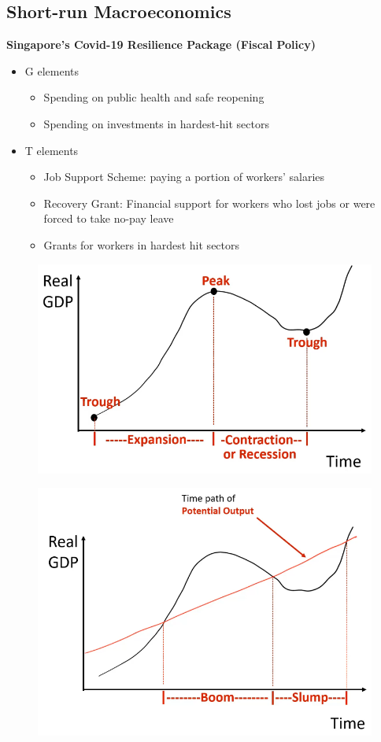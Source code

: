 \documentclass{article}
\begin{document}
\begin{multicols}{2}
\section{Short-run Macroeconomics}
\textbf{Singapore's Covid-19 Resilience Package (Fiscal Policy)}
\begin{itemize}
	\item G elements
	\begin{itemize}
		\item Spending on public health and safe reopening
		\item Spending on investments in hardest-hit sectors
	\end{itemize}
    \item T elements
    \begin{itemize}
    	\item Job Support Scheme: paying a portion of workers' salaries
    	\item Recovery Grant: Financial support for workers who lost jobs or were forced to take no-pay leave
    	\item Grants for workers in hardest hit sectors
    \end{itemize}
\end{itemize}
\begin{figure}[H]
	\centering
	\includegraphics[width=\columnwidth]{images/fluctuations.png}
\end{figure}
\begin{figure}[H]
	\centering
	\includegraphics[width=\columnwidth]{images/boomslump.png}

\end{figure}
\end{multicols}
\end{document}
